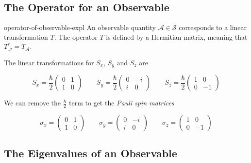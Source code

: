 \documentclass[preview]{standalone}
\begin{document}
\subsection{The Operator for an Observable}

\begin{snippet}{operator-of-observable-expl}
    An observable quantity \(\mathcal{A} \in \mathscr{S}\) corresponds to a linear
    transformation \(T\). The operator \(T\) is defined by a Hermitian matrix, meaning that
    \(T_\mathcal{A}^{\dagger}=T_\mathcal{A}\).

    The linear transformations for \(S_x\), \(S_y\) and \(S_z\) are

    \[
        S_x = \frac{\hbar}{2}
        \begin{pmatrix}
            0 & 1 \\
            1 & 0
        \end{pmatrix}
        \quad\quad
        S_y = \frac{\hbar}{2}
        \begin{pmatrix}
            0 & -i \\
            i & 0
        \end{pmatrix}
        \quad\quad
        S_z = \frac{\hbar}{2}
        \begin{pmatrix}
            1 & 0 \\
            0 & -1
        \end{pmatrix}
    \]

    We can remove the \(\frac{\hbar}{2}\) term to get the \textit{Pauli spin matrices}

    \[
        \sigma_x =
        \begin{pmatrix}
            0 & 1 \\
            1 & 0
        \end{pmatrix}
        \quad\quad
        \sigma_y =
        \begin{pmatrix}
            0 & -i \\
            i & 0
        \end{pmatrix}
        \quad\quad
        \sigma_z =
        \begin{pmatrix}
            1 & 0 \\
            0 & -1
        \end{pmatrix}
    \]
\end{snippet}

\subsection{The Eigenvalues of an Observable}
\end{document}
